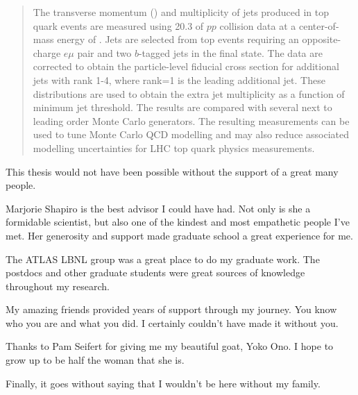 \documentclass[12pt]{ucbthesis}
\begin{document}
\maketitle
\copyrightpage
\begin{abstract}
 The transverse momentum (\pt) and multiplicity of jets produced in top quark events are measured using 20.3 \ifb of $pp$ collision data at a center-of-mass energy of  \tev. Jets are selected from top events requiring an opposite-charge $e\mu$ pair and two $b$-tagged jets in the final state. 
The data are corrected to obtain the particle-level fiducial cross section \sigmapt for additional jets with rank 1-4, where rank=1 is the leading additional jet. These distributions are used to obtain the extra jet multiplicity as a function of minimum jet \pt threshold. The results are compared with several next to leading order Monte Carlo generators. The resulting measurements can be used to tune Monte Carlo QCD modelling and may also reduce associated modelling uncertainties for LHC top quark physics measurements.
\end{abstract}
\begin{frontmatter}

\tableofcontents
\clearpage
\listoffigures
\clearpage
\listoftables

\begin{acknowledgements}
This thesis would not have been possible without the support of a great many people. 

Marjorie Shapiro is the best advisor I could have had. Not only is she a formidable scientist, but also one of the kindest and most empathetic people I've met. Her generosity and support made graduate school a great experience for me.

The ATLAS LBNL group was a great place to do my graduate work. The postdocs and other graduate students were great sources of knowledge throughout my research.

My amazing friends provided years of support through my journey. You know who you are and what you did. I certainly couldn't have made it without you.

Thanks to Pam Seifert for giving me my beautiful goat, Yoko Ono. I hope to grow up to be half the woman that she is.

Finally, it goes without saying that I wouldn't be here without my family. 


\end{acknowledgements}

\end{frontmatter}
\end{document}
